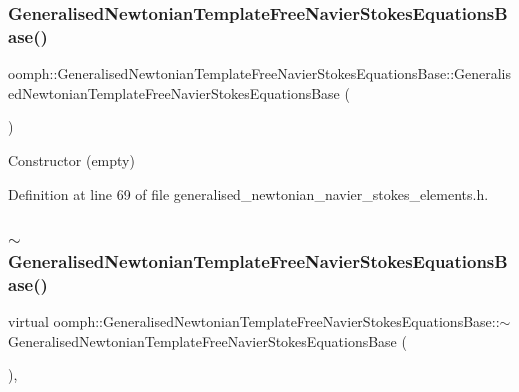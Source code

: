 \subsubsection{\texorpdfstring{Generalised\+Newtonian\+Template\+Free\+Navier\+Stokes\+Equations\+Base()}{GeneralisedNewtonianTemplateFreeNavierStokesEquationsBase()}}
{\footnotesize\ttfamily oomph\+::\+Generalised\+Newtonian\+Template\+Free\+Navier\+Stokes\+Equations\+Base\+::\+Generalised\+Newtonian\+Template\+Free\+Navier\+Stokes\+Equations\+Base (\begin{DoxyParamCaption}{ }\end{DoxyParamCaption})\hspace{0.3cm}{\ttfamily [inline]}}



Constructor (empty) 



Definition at line 69 of file generalised\+\_\+newtonian\+\_\+navier\+\_\+stokes\+\_\+elements.\+h.

\mbox{\label{classoomph_1_1GeneralisedNewtonianTemplateFreeNavierStokesEquationsBase_af6bb8d2f9a6e2b1d70ec38b5779fd6f6}} 
\subsubsection{\texorpdfstring{$\sim$\+Generalised\+Newtonian\+Template\+Free\+Navier\+Stokes\+Equations\+Base()}{~GeneralisedNewtonianTemplateFreeNavierStokesEquationsBase()}}
{\footnotesize\ttfamily virtual oomph\+::\+Generalised\+Newtonian\+Template\+Free\+Navier\+Stokes\+Equations\+Base\+::$\sim$\+Generalised\+Newtonian\+Template\+Free\+Navier\+Stokes\+Equations\+Base (\begin{DoxyParamCaption}{ }\end{DoxyParamCaption})\hspace{0.3cm}{\ttfamily [inline]}, {\ttfamily [virtual]}}




